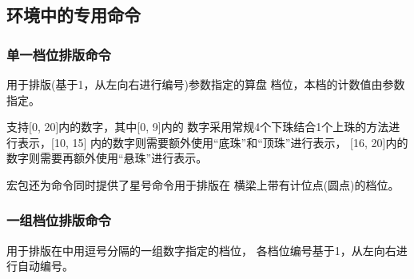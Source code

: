 \documentclass[full]{l3doc}
\begin{document}
\begin{documentation}
\subsection{环境中的专用命令}

\subsubsection{单一档位排版命令}

\begin{function}{\rod}
  \begin{syntax}
      
  \end{syntax}
\end{function}

  用于排版(基于1，从左向右进行编号)参数指定的算盘
  档位，本档的计数值由参数指定。

  支持[0, 20]内的数字，其中[0, 9]内的
  数字采用常规4个下珠结合1个上珠的方法进行表示，[10, 15]
  内的数字则需要额外使用\enquote{底珠}和\enquote{顶珠}进行表示，
  [16, 20]内的数字则需要再额外使用\enquote{悬珠}进行表示。

  宏包还为命令同时提供了星号命令用于排版在
  横梁上带有计位点(圆点)的档位。

\begin{SideBySideExample}[frame=single,numbers=left,%
    xrightmargin=.48\linewidth,gobble=2]
  \centering
  \begin{suanpan}
  \end{suanpan}
\end{SideBySideExample}

\subsubsection{一组档位排版命令}

\begin{function}{\rods}
  \begin{syntax}
     
  \end{syntax}
\end{function}

  用于排版在中用逗号分隔的一组数字指定的档位，
  各档位编号基于1，从左向右进行自动编号。


\end{documentation}
\end{document}
